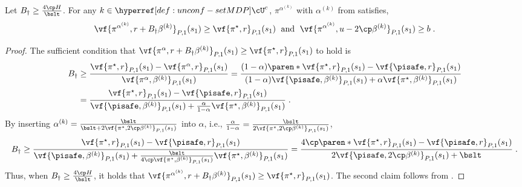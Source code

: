 \begin{lemma}\label{lemma:mixture-optimism}
Let $B_\dagger \geq \frac{4\cp H}{\bslt}$.
For any $k \in \unconfMDP^c$, $\pi^{\alpha^{(k)}}$ with $\alpha^{(k)}$ from  satisfies,
\begin{align*}
\vf{\pi^{\alpha^{(k)}}, r+B_\dagger \beta^{(k)}}_{P, 1}(s_1)  \geq 
\vf{\pi^\star, r}_{P, 1}(s_1) 
\;\text{ and }\;
\vf{\pi^{\alpha^{(k)}}, u-2\cp \beta^{(k)}}_{P, 1}(s_1) \geq b\;.
\end{align*}
\end{lemma}
\begin{proof}
The sufficient condition that
\(
\vf{\pi^\alpha, r+B_\dagger \beta^{(k)}}_{P, 1}(s_1) 
\geq
\vf{\pi^\star, r}_{P, 1}(s_1)
\) to hold is 
\begin{align*}
B_\dagger
&\geq 
\frac{\vf{\pi^\star, r}_{P, 1}(s_1) - \vf{\pi^\alpha, r}_{P, 1}(s_1)}{\vf{\pi^\alpha, \beta^{(k)}}_{P, 1}(s_1)}
= 
\frac{(1-\alpha)\paren*{\vf{\pi^\star, r}_{P, 1}(s_1) - \vf{\pisafe, r}_{P, 1}(s_1)}}
{(1-\alpha)\vf{\pisafe, \beta^{(k)}}_{P, 1}(s_1)
+ \alpha\vf{\pi^\star, \beta^{(k)}}_{P, 1}(s_1)}\\
&= 
\frac{\vf{\pi^\star, r}_{P, 1}(s_1) - \vf{\pisafe, r}_{P, 1}(s_1)}
{\vf{\pisafe, \beta^{(k)}}_{P, 1}(s_1)
+ \frac{\alpha}{1-\alpha}\vf{\pi^\star, \beta^{(k)}}_{P, 1}(s_1)}\;.
\end{align*} 
By inserting $\alpha^{(k)} = \frac{\bslt}{\bslt + 2 \vf{\pi^\star, 2\cp \beta^{(k)}}_{P, 1}(s_1)}$ into $\alpha$, i.e., 
$\frac{\alpha}{1-\alpha} = \frac{\bslt}{2 \vf{\pi^\star, 2\cp \beta^{(k)}}_{P, 1}(s_1)}$, 
\begin{align*}
B_\dagger
\geq
\frac{\vf{\pi^\star, r}_{P, 1}(s_1) - \vf{\pisafe, r}_{P, 1}(s_1)}
{\vf{\pisafe, \beta^{(k)}}_{P, 1}(s_1)
+ \frac{\bslt}{4\cp \vf{\pi^\star, \beta^{(k)}}_{P, 1}(s_1)}\vf{\pi^\star, \beta^{(k)}}_{P, 1}(s_1)}
= 
\frac{4\cp\paren*{\vf{\pi^\star, r}_{P, 1}(s_1) - \vf{\pisafe, r}_{P, 1}(s_1)}}
{2\vf{\pisafe, 2\cp \beta^{(k)}}_{P, 1}(s_1) + \bslt}\;.
\end{align*} 
Thus, when $B_\dagger \geq \frac{4\cp H}{\bslt}$, 
it holds that \(\vf{\pi^{\alpha^{(k)}}, r+B_\dagger \beta^{(k)}}_{P, 1}(s_1)  \geq \vf{\pi^\star, r}_{P, 1}(s_1)\).
The second claim follows from .
\end{proof}

